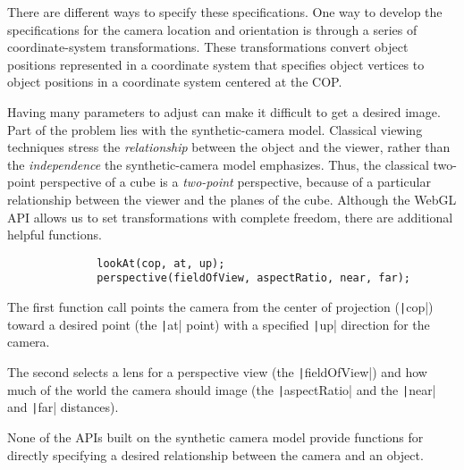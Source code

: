\documentclass[\main/notes.tex]{subfiles}
\begin{document}
          There are different ways to specify these specifications.
          One way to develop the specifications for the camera location and orientation
          is through a series of coordinate-system transformations.
          These transformations convert object positions
          represented in a coordinate system that specifies object vertices
          to object positions in a coordinate system centered at the COP.

          Having many parameters to adjust can make it difficult to get a desired image.
          Part of the problem lies with the synthetic-camera model.
          Classical viewing techniques stress the
          \emph{relationship} between the object and the viewer,
          rather than the \emph{independence} the synthetic-camera model emphasizes.
          Thus, the classical two-point perspective of a cube is a \emph{two-point} perspective,
          because of a particular relationship between the viewer and the planes of the cube.
          Although the WebGL API allows us to set transformations with complete freedom,
          there are additional helpful functions.

          \begin{example}
            \vspace{-1em}
            \begin{verbatim}
              lookAt(cop, at, up);
              perspective(fieldOfView, aspectRatio, near, far);
            \end{verbatim}
            \vspace{-3em}

            The first function call points the camera from the center of projection
            (\texttt|cop|)
            toward a desired point
            (the \texttt|at| point)
            with a specified \texttt|up| direction for the camera.

            The second selects a lens for a perspective view
            (the \texttt|fieldOfView|)
            and how much of the world the camera should image
            (the \texttt|aspectRatio| and the \texttt|near| and
            \texttt|far| distances).
          \end{example}

          None of the APIs built on the synthetic camera model provide functions
          for directly specifying a desired relationship between the camera and an object.
\end{document}
